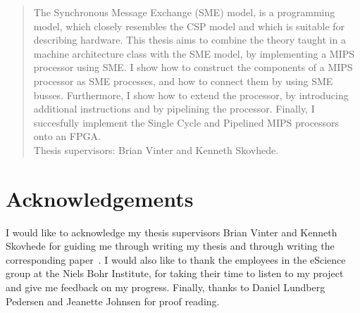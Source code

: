 \documentclass[a4paper]{article}
\begin{document}
\maketitle


\begin{abstract}
    The Synchronous Message Exchange (SME) model, is a programming model, which
    closely resembles the CSP model and which is suitable for describing
    hardware. This thesis aims to combine the theory taught in a machine
    architecture class with the SME model, by implementing a MIPS processor
    using SME. I show how to construct the components of a MIPS processor as
    SME processes, and how to connect them by using SME busses. Furthermore, I
    show how to extend the processor, by introducing additional instructions
    and by pipelining the processor. Finally, I succesfully implement the
    Single Cycle and Pipelined MIPS processors onto an FPGA. \\

    \noindent
    Thesis supervisors: Brian Vinter and Kenneth Skovhede.
\end{abstract}

\newpage
\section*{Acknowledgements}
I would like to acknowledge my thesis supervisors Brian Vinter and Kenneth
Skovhede for guiding me through writing my thesis and through writing the
corresponding paper~\cite{ref:cpa-paper}. I would also like to thank the
employees in the eScience group at the Niels Bohr Institute, for taking their
time to listen to my project and give me feedback on my progress. Finally,
thanks to Daniel Lundberg Pedersen and Jeanette Johnsen for proof reading.

\newpage
\tableofcontents
\newpage


\end{document}
